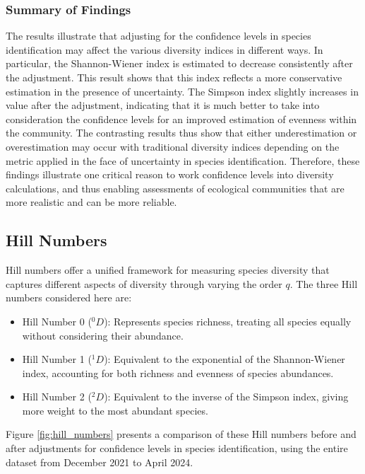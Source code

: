 \documentclass[a4paper,12pt]{article}
\begin{document}
\subsubsection{Summary of Findings}
The results illustrate that adjusting for the confidence levels in species identification may affect the various diversity indices in different ways. In particular, the Shannon-Wiener index is estimated to decrease consistently after the adjustment. This result shows that this index reflects a more conservative estimation in the presence of uncertainty. The Simpson index slightly increases in value after the adjustment, indicating that it is much better to take into consideration the confidence levels for an improved estimation of evenness within the community. The contrasting results thus show that either underestimation or overestimation may occur with traditional diversity indices depending on the metric applied in the face of uncertainty in species identification. Therefore, these findings illustrate one critical reason to work confidence levels into diversity calculations, and thus enabling assessments of ecological communities that are more realistic and can be more reliable.





\subsection{Hill Numbers}

Hill numbers offer a unified framework for measuring species diversity that captures different aspects of diversity through varying the order $q$. The three Hill numbers considered here are:


\begin{itemize}
    \item Hill Number 0 (${}^0D$): Represents species richness, treating all species equally without considering their abundance.
    \item Hill Number 1 (${}^1D$): Equivalent to the exponential of the Shannon-Wiener index, accounting for both richness and evenness of species abundances.
    \item Hill Number 2 (${}^2D$): Equivalent to the inverse of the Simpson index, giving more weight to the most abundant species.
\end{itemize}

Figure \ref{fig:hill_numbers} presents a comparison of these Hill numbers before and after adjustments for confidence levels in species identification, using the entire dataset from December 2021 to April 2024.
\end{document}
